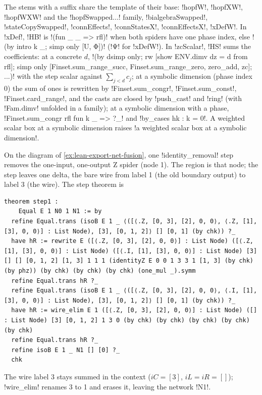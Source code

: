 {The stems with a suffix share the template of their base: \code!hopfW!, \code!hopfXW!,
\code!hopfWXW! and the \code!hopfSwapped...! family, \code!bialgebraSwapped!,
\code!stateCopySwapped!, \code!connEffects!, \code!connStatesX!, \code!connEffectsX!,
\code!xDefW!. In \code!xDef!, \code!HB! is \code!(fun _ _ => rfl)! when both spiders have one
phase index, else \leanx!(by intro k _; simp only [U, Φ])! (\leanx!Ψ! for \code!xDefW!). In
\code!zcScalar!, \code!HS! sums the coefficients: at a concrete $d$,
\code!(by dsimp only; rw [show ENV.dimv dz = d from rfl]; simp only [Finset.sum_range_succ, Finset.sum_range_zero, zero_add, zc]; ...)!
with the step scalar against $\sum_{j<d} c_j$; at a symbolic dimension (phase index 0) the sum of
ones is rewritten by \code!Finset.sum_congr!, \code!Finset.sum_const!, \code!Finset.card_range!,
and the casts are closed by \code!push_cast! and \code!ring! (with \code!Fam.dimv! unfolded in a
family); at a symbolic dimension with a phase, \code!Finset.sum_congr rfl fun k _ => ?_! and
\code!by_cases hk : k = 0!. A weighted scalar box at a symbolic dimension raises
\code!a weighted scalar box at a symbolic dimension!.

\begin{example}\label{ex:lean-export-net-identity}
On the diagram of \cref{ex:lean-export-net-fusion}, one \code!identity_removal! step removes the
one-input, one-output Z spider (node 1). The region is that node; the step leaves one delta, the
bare wire from label 1 (the old boundary output) to label 3 (the wire). The step theorem is
\begin{lstlisting}[style=leannet]
theorem step1 :
    Equal E 1 N0 1 N1 := by
  refine Equal.trans (isoB E 1 _ ⟨([⟨.Z, [0, 3], [2], 0, 0⟩, ⟨.Z, [1], [3], 0, 0⟩] : List Node), [3], [0, 1, 2]⟩ [] [0, 1] (by chk)) ?_
  have hR := rewrite E ([⟨.Z, [0, 3], [2], 0, 0⟩] : List Node) ([⟨.Z, [1], [3], 0, 0⟩] : List Node) ([⟨.I, [1], [3], 0, 0⟩] : List Node) [3] [] [] [0, 1, 2] [1, 3] 1 1 1 (identityZ E 0 0 1 3 3 1 [1, 3] (by chk) (by phz)) (by chk) (by chk) (by chk) (one_mul _).symm
  refine Equal.trans hR ?_
  refine Equal.trans (isoB E 1 _ ⟨([⟨.Z, [0, 3], [2], 0, 0⟩, ⟨.I, [1], [3], 0, 0⟩] : List Node), [3], [0, 1, 2]⟩ [] [0, 1] (by chk)) ?_
  have hR := wire_elim E 1 ([⟨.Z, [0, 3], [2], 0, 0⟩] : List Node) ([] : List Node) [3] [0, 1, 2] 1 3 0 (by chk) (by chk) (by chk) (by chk) (by chk)
  refine Equal.trans hR ?_
  refine isoB E 1 _ N1 [] [0] ?_
  chk
\end{lstlisting}
The wire label 3 stays summed in the context ($iC = [3]$, $iL = iR = []$); \lean!wire_elim!
renames 3 to 1 and erases it, leaving the network \code!N1!.
\end{example}

}
